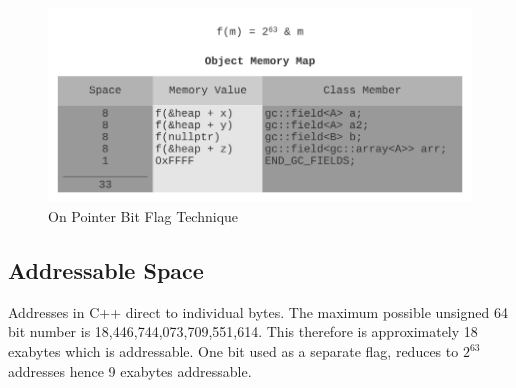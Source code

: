 \documentclass[11pt]{article}
\begin{document}
\begin{figure}
\begin{center}
\includegraphics[scale=0.5]{./report_srcs/on_pointer_bit_flag_technique.png}
\caption{On Pointer Bit Flag Technique}
\label{fig:mark:onpointerflag}
\end{center}
\end{figure}

\subsection{Addressable Space}
\label{app:addessablespace}
Addresses in C++ direct to individual bytes. The maximum possible unsigned 64 bit number is
18,446,744,073,709,551,614. This therefore is approximately 18 exabytes which is addressable. One bit
used as a separate flag, reduces to $2^{63}$ addresses hence 9 exabytes addressable.
\end{document}
